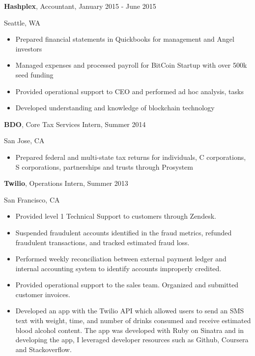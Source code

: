 \documentclass[margin,line]{res}
\begin{document}
\begin{resume}
\vspace*{-3mm}
{\bf Hashplex},  Accountant, January 2015 - June 2015

\vspace*{-4mm}Seattle, WA
\begin{itemize}[leftmargin=*]
\item Prepared financial statements in Quickbooks for management and Angel investors
\item Managed expenses and processed payroll for BitCoin Startup with over 500k seed funding
\item Provided operational support to CEO and performed ad hoc analysis, tasks
\item Developed understanding and knowledge of blockchain technology
\end{itemize}
\vspace*{6mm}


\vspace*{-3mm}
{\bf BDO},  Core Tax Services Intern, Summer 2014 

\vspace*{-4mm}San Jose, CA
\begin{itemize}[leftmargin=*]
\item Prepared federal and multi-state tax returns for individuals, C corporations, S corporations, partnerships and trusts through Prosystem
\end{itemize}
\vspace*{1.5mm}


\vspace*{-3mm}
{\bf Twilio},  Operations Intern, Summer 2013 

\vspace*{-4mm}San Francisco, CA
\begin{itemize}[leftmargin=*]
\item Provided level 1 Technical Support to customers through Zendesk.
\item Suspended fraudulent accounts identified in the fraud metrics, refunded fraudulent transactions, and tracked estimated fraud loss.
\item Performed weekly reconciliation between external payment ledger and internal accounting system to identify accounts improperly credited.
\item Provided operational support to the sales team. Organized and submitted customer invoices.
\item Developed an app with the Twilio API which allowed users to send an SMS text with weight, time, and number of drinks consumed and receive estimated blood alcohol content. The app was developed with Ruby on Sinatra and in developing the app, I leveraged developer resources such as Github, Coursera and Stackoverflow.  
\end{itemize}


\end{resume}
\end{document}
